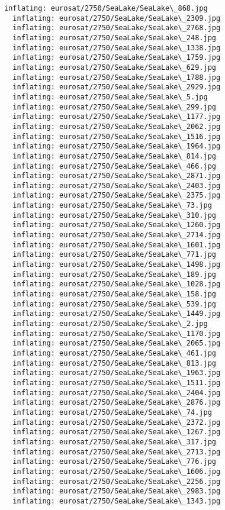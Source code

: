 \documentclass[11pt]{article}
\begin{document}
\begin{Verbatim}[commandchars=\\\{\}]
  inflating: eurosat/2750/SeaLake/SeaLake\_868.jpg
  inflating: eurosat/2750/SeaLake/SeaLake\_2309.jpg
  inflating: eurosat/2750/SeaLake/SeaLake\_2768.jpg
  inflating: eurosat/2750/SeaLake/SeaLake\_248.jpg
  inflating: eurosat/2750/SeaLake/SeaLake\_1338.jpg
  inflating: eurosat/2750/SeaLake/SeaLake\_1759.jpg
  inflating: eurosat/2750/SeaLake/SeaLake\_629.jpg
  inflating: eurosat/2750/SeaLake/SeaLake\_1788.jpg
  inflating: eurosat/2750/SeaLake/SeaLake\_2929.jpg
  inflating: eurosat/2750/SeaLake/SeaLake\_5.jpg
  inflating: eurosat/2750/SeaLake/SeaLake\_299.jpg
  inflating: eurosat/2750/SeaLake/SeaLake\_1177.jpg
  inflating: eurosat/2750/SeaLake/SeaLake\_2062.jpg
  inflating: eurosat/2750/SeaLake/SeaLake\_1516.jpg
  inflating: eurosat/2750/SeaLake/SeaLake\_1964.jpg
  inflating: eurosat/2750/SeaLake/SeaLake\_814.jpg
  inflating: eurosat/2750/SeaLake/SeaLake\_466.jpg
  inflating: eurosat/2750/SeaLake/SeaLake\_2871.jpg
  inflating: eurosat/2750/SeaLake/SeaLake\_2403.jpg
  inflating: eurosat/2750/SeaLake/SeaLake\_2375.jpg
  inflating: eurosat/2750/SeaLake/SeaLake\_73.jpg
  inflating: eurosat/2750/SeaLake/SeaLake\_310.jpg
  inflating: eurosat/2750/SeaLake/SeaLake\_1260.jpg
  inflating: eurosat/2750/SeaLake/SeaLake\_2714.jpg
  inflating: eurosat/2750/SeaLake/SeaLake\_1601.jpg
  inflating: eurosat/2750/SeaLake/SeaLake\_771.jpg
  inflating: eurosat/2750/SeaLake/SeaLake\_1498.jpg
  inflating: eurosat/2750/SeaLake/SeaLake\_189.jpg
  inflating: eurosat/2750/SeaLake/SeaLake\_1028.jpg
  inflating: eurosat/2750/SeaLake/SeaLake\_158.jpg
  inflating: eurosat/2750/SeaLake/SeaLake\_539.jpg
  inflating: eurosat/2750/SeaLake/SeaLake\_1449.jpg
  inflating: eurosat/2750/SeaLake/SeaLake\_2.jpg
  inflating: eurosat/2750/SeaLake/SeaLake\_1170.jpg
  inflating: eurosat/2750/SeaLake/SeaLake\_2065.jpg
  inflating: eurosat/2750/SeaLake/SeaLake\_461.jpg
  inflating: eurosat/2750/SeaLake/SeaLake\_813.jpg
  inflating: eurosat/2750/SeaLake/SeaLake\_1963.jpg
  inflating: eurosat/2750/SeaLake/SeaLake\_1511.jpg
  inflating: eurosat/2750/SeaLake/SeaLake\_2404.jpg
  inflating: eurosat/2750/SeaLake/SeaLake\_2876.jpg
  inflating: eurosat/2750/SeaLake/SeaLake\_74.jpg
  inflating: eurosat/2750/SeaLake/SeaLake\_2372.jpg
  inflating: eurosat/2750/SeaLake/SeaLake\_1267.jpg
  inflating: eurosat/2750/SeaLake/SeaLake\_317.jpg
  inflating: eurosat/2750/SeaLake/SeaLake\_2713.jpg
  inflating: eurosat/2750/SeaLake/SeaLake\_776.jpg
  inflating: eurosat/2750/SeaLake/SeaLake\_1606.jpg
  inflating: eurosat/2750/SeaLake/SeaLake\_2256.jpg
  inflating: eurosat/2750/SeaLake/SeaLake\_2983.jpg
  inflating: eurosat/2750/SeaLake/SeaLake\_1343.jpg

\end{Verbatim}
\end{document}
